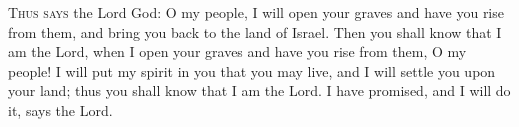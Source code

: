 
\lettrine{T}{hus says} the Lord God: O my people, I will open your graves and have you rise from them, and bring you back to the land of Israel. Then you shall know that I am the Lord, when I open your graves and have you rise from them, O my people! I will put my spirit in you that you may live, and I will settle you upon your land; thus you shall know that I am the Lord. I have promised, and I will do it, says the Lord.
